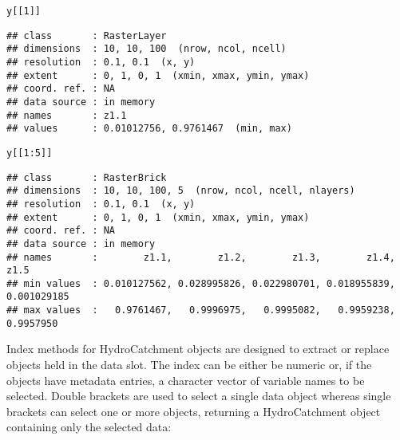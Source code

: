 \documentclass{icldt}\usepackage[]{graphicx}\usepackage[]{color}
\makeatletter
\newcommand{\hlnum}[1]{\textcolor[rgb]{0.686,0.059,0.569}{#1}}%
\newcommand{\hlopt}[1]{\textcolor[rgb]{0,0,0}{#1}}%
\newcommand{\hlstd}[1]{\textcolor[rgb]{0.345,0.345,0.345}{#1}}%
\newenvironment{kframe}{%
 \def\at@end@of@kframe{}%
 \ifinner\ifhmode%
  \def\at@end@of@kframe{\end{minipage}}%
  \begin{minipage}{\columnwidth}%
 \fi\fi%
 \def\FrameCommand##1{\hskip\@totalleftmargin \hskip-\fboxsep
 \colorbox{shadecolor}{##1}\hskip-\fboxsep
     \hskip-\linewidth \hskip-\@totalleftmargin \hskip\columnwidth}%
 \MakeFramed {\advance\hsize-\width
   \@totalleftmargin\z@ \linewidth\hsize
   \@setminipage}}%
 {\par\unskip\endMakeFramed%
 \at@end@of@kframe}
\newenvironment{knitrout}{}{} %
\makeatother
\begin{document}
\begin{knitrout}
\color{fgcolor}\begin{kframe}
\begin{alltt}
\hlstd{y[[}\hlnum{1}\hlstd{]]}
\end{alltt}
\begin{verbatim}
## class       : RasterLayer 
## dimensions  : 10, 10, 100  (nrow, ncol, ncell)
## resolution  : 0.1, 0.1  (x, y)
## extent      : 0, 1, 0, 1  (xmin, xmax, ymin, ymax)
## coord. ref. : NA 
## data source : in memory
## names       : z1.1 
## values      : 0.01012756, 0.9761467  (min, max)
\end{verbatim}
\begin{alltt}
\hlstd{y[[}\hlnum{1}\hlopt{:}\hlnum{5}\hlstd{]]}
\end{alltt}
\begin{verbatim}
## class       : RasterBrick 
## dimensions  : 10, 10, 100, 5  (nrow, ncol, ncell, nlayers)
## resolution  : 0.1, 0.1  (x, y)
## extent      : 0, 1, 0, 1  (xmin, xmax, ymin, ymax)
## coord. ref. : NA 
## data source : in memory
## names       :        z1.1,        z1.2,        z1.3,        z1.4,        z1.5 
## min values  : 0.010127562, 0.028995826, 0.022980701, 0.018955839, 0.001029185 
## max values  :   0.9761467,   0.9996975,   0.9995082,   0.9959238,   0.9957950
\end{verbatim}
\end{kframe}
\end{knitrout}

Index methods for HydroCatchment objects are designed to extract or replace objects held in the data slot. The index can be either be numeric or, if the objects have metadata entries, a character vector of variable names to be selected. Double brackets are used to select a single data object whereas single brackets can select one or more objects, returning a HydroCatchment object containing only the selected data:
\end{document}

